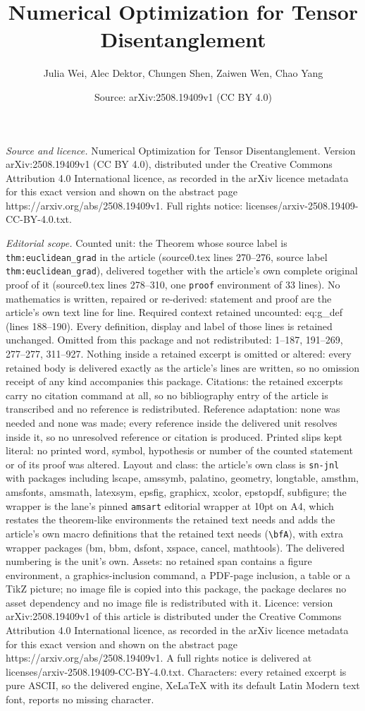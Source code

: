 \documentclass[10pt,a4paper]{amsart}
\title[Numerical Optimization for Tensor Disentanglement]{Numerical Optimization for Tensor Disentanglement}
\author{Julia Wei, Alec Dektor, Chungen Shen, Zaiwen Wen, Chao Yang}
\date{Source: arXiv:2508.19409v1 (CC BY 4.0)}
\begin{document}
\maketitle

\noindent\emph{Source and licence.} Numerical Optimization for Tensor Disentanglement. Version arXiv:2508.19409v1 (CC BY 4.0), distributed under the Creative Commons Attribution 4.0 International licence, as recorded in the arXiv licence metadata for this exact version and shown on the abstract page https://arxiv.org/abs/2508.19409v1. Full rights notice: licenses/arxiv-2508.19409-CC-BY-4.0.txt.\par\smallskip

\noindent\textit{Editorial scope.} Counted unit: the Theorem whose source label is \texttt{thm:euclidean\_grad} in the article (source0.tex lines 270--276, source label \texttt{thm:euclidean\_grad}), delivered together with the article's own complete original proof of it (source0.tex lines 278--310, one \texttt{proof} environment of 33 lines). No mathematics is written, repaired or re-derived: statement and proof are the article's own text line for line. Required context retained uncounted: eq:g\_def (lines 188--190). Every definition, display and label of those lines is retained unchanged. Omitted from this package and not redistributed: 1--187, 191--269, 277--277, 311--927. Nothing inside a retained excerpt is omitted or altered: every retained body is delivered exactly as the article's lines are written, so no omission receipt of any kind accompanies this package. Citations: the retained excerpts carry no citation command at all, so no bibliography entry of the article is transcribed and no reference is redistributed. Reference adaptation: none was needed and none was made; every reference inside the delivered unit resolves inside it, so no unresolved reference or citation is produced. Printed slips kept literal: no printed word, symbol, hypothesis or number of the counted statement or of its proof was altered. Layout and class: the article's own class is \texttt{sn-jnl} with packages including lscape, amssymb, palatino, geometry, longtable, amsthm, amsfonts, amsmath, latexsym, epsfig, graphicx, xcolor, epstopdf, subfigure; the wrapper is the lane's pinned \texttt{amsart} editorial wrapper at 10pt on A4, which restates the theorem-like environments the retained text needs and adds the article's own macro definitions that the retained text needs (\texttt{\textbackslash bfA}), with extra wrapper packages (bm, bbm, dsfont, xspace, cancel, mathtools). The delivered numbering is the unit's own. Assets: no retained span contains a figure environment, a graphics-inclusion command, a PDF-page inclusion, a table or a TikZ picture; no image file is copied into this package, the package declares no asset dependency and no image file is redistributed with it. Licence: version arXiv:2508.19409v1 of this article is distributed under the Creative Commons Attribution 4.0 International licence, as recorded in the arXiv licence metadata for this exact version and shown on the abstract page https://arxiv.org/abs/2508.19409v1. A full rights notice is delivered at licenses/arxiv-2508.19409-CC-BY-4.0.txt. Characters: every retained excerpt is pure ASCII, so the delivered engine, XeLaTeX with its default Latin Modern text font, reports no missing character.
\end{document}
